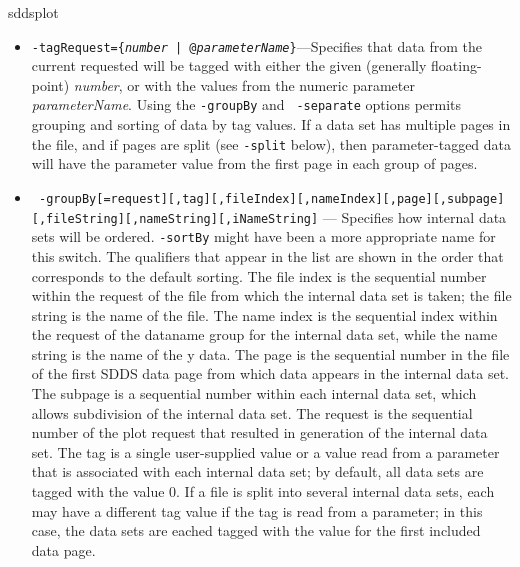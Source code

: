 \begin{sddsprog}{sddsplot}
\begin{itemize}
\begin{itemize}
The {\tt xgap} and {\tt ygap} qualifiers invoke a more sophisticated and more generally applicable form of
severing.  For each dimension for which severing is requested, the pen is lifted whenever the absolute
difference of two successive values exceeds a defined limit.  This limit is specified either in absolute
or fractional terms using the {\em value} entry.  If {\em value} is positive, the gap threshold is equal
to {\em value}.  If {\em value} is negative, the gap threshold is {\em -value} times the mean spacing
between successive points; a value of -1.5 has been found to work well for data that is roughly equispaced
with occasional missing points.

  \item {\tt -tagRequest=\{{\em number} | @{\em parameterName}\}}---Specifies that data from the
current requested will be tagged with either the given (generally floating-point) {\em number}, or
with the values from the numeric parameter {\em parameterName}.  Using the {\tt -groupBy} and {\tt
-separate} options permits grouping and sorting of data by tag values.  If a data set has multiple
pages in the file, and if pages are split (see {\tt -split} below), then parameter-tagged data will
have the parameter value from the first page in each group of pages.

  \item {\tt
 -groupBy[=request][,tag][,fileIndex][,nameIndex][,page][,subpage]} {\tt [,fileString][,nameString][,iNameString]} ---
 Specifies how internal data sets will be ordered.  {\tt -sortBy} might have been a more appropriate
 name for this switch.  The qualifiers that appear in the list are shown in the order that
 corresponds to the default sorting.  The file index is the sequential number within the request of
 the file from which the internal data set is taken; the file string is the name of the file.  The
 name index is the sequential index within the request of the dataname group for the internal data
 set, while the name string is the name of the y data.  The page is the sequential number in the file
 of the first SDDS data page from which data appears in the internal data set.  The subpage is a
 sequential number within each internal data set, which allows subdivision of the internal data set.
 The request is the sequential number of the plot request that resulted in generation of the internal
 data set.  The tag is a single user-supplied value or a value read from a parameter that is
 associated with each internal data set; by default, all data sets are tagged with the value 0.  If a
 file is split into several internal data sets, each may have a different tag value if the tag is
 read from a parameter; in this case, the data sets are eached tagged with the value for the first
 included data page.


\end{itemize}
\end{itemize}
\end{sddsprog}
